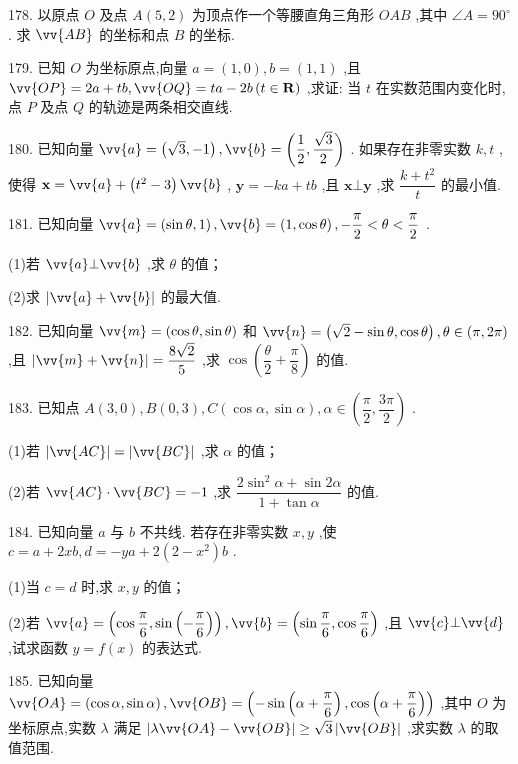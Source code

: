 178. 以原点 $O$ 及点 $A\left( {5,2}\right)$ 为顶点作一个等腰直角三角形 ${OAB}$ ,其中 $\angle A = {90}^{ \circ  }$ . 求 $\vv{AB}$ 的坐标和点 $B$ 的坐标.

179. 已知 $O$ 为坐标原点,向量 $a = \left( {1,0}\right) ,b = \left( {1,1}\right)$ ,且 $\vv{OP} = {2a} + {tb},\vv{OQ} = {ta} - {2b}\left( {t \in  \mathbf{R}}\right)$ ,求证: 当 $t$ 在实数范围内变化时,点 $P$ 及点 $Q$ 的轨迹是两条相交直线.

180. 已知向量 $\vv{a} = \left( {\sqrt{3}, - 1}\right) ,\vv{b} = \left( {\dfrac{1}{2},\dfrac{\sqrt{3}}{2}}\right)$ . 如果存在非零实数 $k,t$ ,使得 $\mathbf{x} = \vv{a} + \left( {{t}^{2} - 3}\right) \vv{b}$ , $\mathbf{y} =  - {ka} + {tb}$ ,且 $\mathbf{x} \bot  \mathbf{y}$ ,求 $\dfrac{k + {t}^{2}}{t}$ 的最小值.

181. 已知向量 $\vv{a} = \left( {\sin \theta ,1}\right) ,\vv{b} = \left( {1,\cos \theta }\right) , - \dfrac{\pi }{2} < \theta  < \dfrac{\pi }{2}$ .

(1)若 $\vv{a}\bot \vv{b}$ ,求 $\theta$ 的值；

(2)求 $\left| {\vv{a} + \vv{b}}\right|$ 的最大值.

182. 已知向量 $\vv{m} = \left( {\cos \theta ,\sin \theta }\right)$ 和 $\vv{n} = \left( {\sqrt{2} - \sin \theta ,\cos \theta }\right) ,\theta  \in  \left( {\pi ,{2\pi }}\right)$ ,且 $\left| {\vv{m} + \vv{n}}\right|  = \dfrac{8\sqrt{2}}{5}$ ,求 $\cos \left( {\dfrac{\theta }{2} + \dfrac{\pi }{8}}\right)$ 的值.

183. 已知点 $A\left( {3,0}\right) ,B\left( {0,3}\right) ,C\left( {\cos \alpha ,\sin \alpha }\right) ,\alpha  \in  \left( {\dfrac{\pi }{2},\dfrac{3\pi }{2}}\right)$ .

(1)若 $\left| \vv{AC}\right|  = \left| \vv{BC}\right|$ ,求 $\alpha$ 的值；

(2)若 $\vv{AC} \cdot  \vv{BC} =  - 1$ ,求 $\dfrac{2{\sin }^{2}\alpha  + \sin {2\alpha }}{1 + \tan \alpha }$ 的值.

184. 已知向量 $a$ 与 $b$ 不共线. 若存在非零实数 $x,y$ ,使 $c = a + {2xb},d =  - {ya} + 2\left( {2 - {x}^{2}}\right) b$ .

(1)当 $c = d$ 时,求 $x,y$ 的值；

(2)若 $\vv{a} = \left( {\cos \dfrac{\pi }{6},\sin \left( {-\dfrac{\pi }{6}}\right) }\right) ,\vv{b} = \left( {\sin \dfrac{\pi }{6},\cos \dfrac{\pi }{6}}\right)$ ,且 $\vv{c}\bot \vv{d}$ ,试求函数 $y = f\left( x\right)$ 的表达式.

185. 已知向量 $\vv{OA} = \left( {\cos \alpha ,\sin \alpha }\right) ,\vv{OB} = \left( {-\sin \left( {\alpha  + \dfrac{\pi }{6}}\right) ,\cos \left( {\alpha  + \dfrac{\pi }{6}}\right) }\right)$ ,其中 $O$ 为坐标原点,实数 $\lambda$ 满足 $\left| {\lambda \vv{OA} - \vv{OB}}\right|  \geq  \sqrt{3}\left| \vv{OB}\right|$ ,求实数 $\lambda$ 的取值范围.

